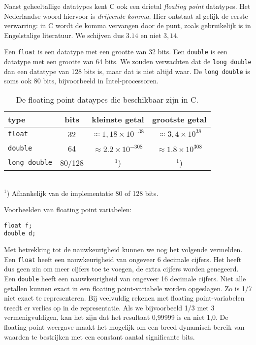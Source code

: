 Naast geheeltallige datatypes kent C ook een drietal \textsl{floating point} datatypes. Het Nederlandse woord hiervoor is \textsl{drijvende komma}. Hier ontstaat al gelijk de eerste verwarring: in C wordt de komma vervangen door de punt, zoals gebruikelijk is in Engelstalige literatuur. We schijven dus $3.14$ en niet $3,14$.

Een \texttt{float} is een datatype met een grootte van 32 bits. Een \texttt{double} is een datatype met een grootte van 64 bits. We zouden verwachten dat de \texttt{long double} dan een datatype van 128 bits is, maar dat is niet altijd waar. De \texttt{long double} is soms ook 80 bits, bijvoorbeeld in Intel-processoren.

\begin{table}[!ht]
\centering
\caption{De floating point dataypes die beschikbaar zijn in C.}
\label{tab:varfloatdatatypes}
\begin{tabular}{@{}lccc@{}}
\toprule
\textbf{type}          & \textbf{bits} & \textbf{kleinste getal} &  \textbf{grootste getal} \\ \midrule
\texttt{float}         & 32                      & $\approx1,18\times10^{-38}$ & $\approx3,4\times10^{38}$  \\
\texttt{double   }     & 64                      & $\approx2.2\times10^{-308}$ & $\approx1.8\times10^{308}$ \\
\texttt{long double}   & 80/128                      & $^1$) & $^1$)  \\
\bottomrule
\end{tabular}\\
\footnotesize$^1$) Afhankelijk van de implementatie 80 of 128 bits.
\end{table}

Voorbeelden van floating point variabelen:

\hspace*{1em}\texttt{float f;}\\
\hspace*{1em}\texttt{double d;}

Met betrekking tot de nauwkeurigheid kunnen we nog het volgende vermelden. Een \texttt{float} heeft een nauwkeurigheid van ongeveer 6 decimale cijfers. Het heeft dus geen zin om meer cijfers toe te voegen, de extra cijfers worden genegeerd. Een \texttt{double} heeft een nauwkeurigheid van ongeveer 16 decimale cijfers. Niet alle getallen kunnen exact in een floating point-variabele worden opgeslagen. Zo is 1/7 niet exact te representeren. Bij veelvuldig rekenen met floating point-variabelen treedt er verlies op in de representatie. Als we bijvoorbeeld 1/3 met 3 vermenigvuldigen, kan het zijn dat het resultaat 0,99999 is en niet 1,0. De floating-point weergave maakt het mogelijk om een breed dynamisch bereik van waarden te bestrijken met een constant aantal significante bits.

